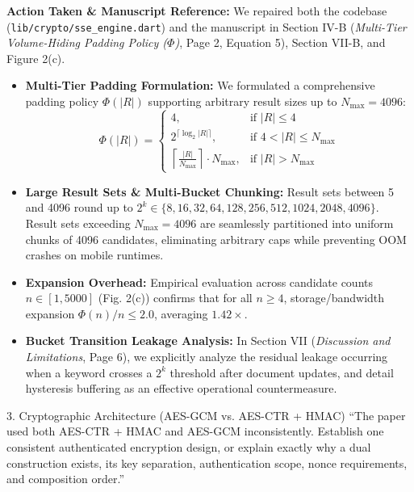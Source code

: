 \documentclass[11pt,a4paper]{article}
\begin{document}
\begin{responsebox}
\textbf{Action Taken \& Manuscript Reference:} We repaired both the codebase (\texttt{lib/crypto/sse\_engine.dart}) and the manuscript in Section IV-B (\emph{Multi-Tier Volume-Hiding Padding Policy ($\Phi$)}, Page 2, Equation 5), Section VII-B, and Figure 2(c).

\begin{itemize}[itemsep=2pt]
    \item \textbf{Multi-Tier Padding Formulation:} We formulated a comprehensive padding policy $\Phi(|R|)$ supporting arbitrary result sizes up to $N_{\max} = 4096$:
    \begin{equation}
    \Phi(|R|) = 
    \begin{cases}
    4, & \text{if } |R| \le 4 \\
    2^{\lceil \log_2 |R| \rceil}, & \text{if } 4 < |R| \le N_{\max} \\
    \left\lceil \frac{|R|}{N_{\max}} \right\rceil \cdot N_{\max}, & \text{if } |R| > N_{\max}
    \end{cases}
    \end{equation}
    \item \textbf{Large Result Sets \& Multi-Bucket Chunking:} Result sets between 5 and 4096 round up to $2^k \in \{8, 16, 32, 64, 128, 256, 512, 1024, 2048, 4096\}$. Result sets exceeding $N_{\max} = 4096$ are seamlessly partitioned into uniform chunks of 4096 candidates, eliminating arbitrary caps while preventing OOM crashes on mobile runtimes.
    \item \textbf{Expansion Overhead:} Empirical evaluation across candidate counts $n \in [1, 5000]$ (Fig. 2(c)) confirms that for all $n \ge 4$, storage/bandwidth expansion $\Phi(n)/n \le 2.0$, averaging $1.42\times$.
    \item \textbf{Bucket Transition Leakage Analysis:} In Section VII (\emph{Discussion and Limitations}, Page 6), we explicitly analyze the residual leakage occurring when a keyword crosses a $2^k$ threshold after document updates, and detail hysteresis buffering as an effective operational countermeasure.
\end{itemize}
\end{responsebox}

\vspace{1em}

\begin{reviewbox}{3. Cryptographic Architecture (AES-GCM vs. AES-CTR + HMAC)}
``The paper used both AES-CTR + HMAC and AES-GCM inconsistently. Establish one consistent authenticated encryption design, or explain exactly why a dual construction exists, its key separation, authentication scope, nonce requirements, and composition order.''
\end{reviewbox}
\end{document}
